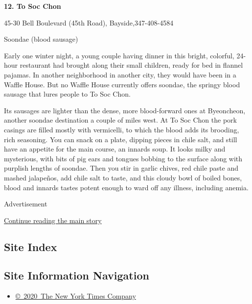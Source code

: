 \textbf{12. To Soc Chon}

45-30 Bell Boulevard (45th Road), Bayside,347-408-4584

Soondae (blood sausage)

Early one winter night, a young couple having dinner in this bright,
colorful, 24-hour restaurant had brought along their small children,
ready for bed in flannel pajamas. In another neighborhood in another
city, they would have been in a Waffle House. But no Waffle House
currently offers soondae, the springy blood sausage that lures people to
To Soc Chon.

Its sausages are lighter than the dense, more blood-forward ones at
Byeoncheon, another soondae destination a couple of miles west. At To
Soc Chon the pork casings are filled mostly with vermicelli, to which
the blood adds its brooding, rich seasoning. You can snack on a plate,
dipping pieces in chile salt, and still have an appetite for the main
course, an innards soup. It looks milky and mysterious, with bits of pig
ears and tongues bobbing to the surface along with purplish lengths of
soondae. Then you stir in garlic chives, red chile paste and mashed
jalapeños, add chile salt to taste, and this cloudy bowl of boiled
bones, blood and innards tastes potent enough to ward off any illness,
including anemia.

Advertisement

\protect\hyperlink{after-bottom}{Continue reading the main story}

\hypertarget{site-index}{%
\subsection{Site Index}\label{site-index}}

\hypertarget{site-information-navigation}{%
\subsection{Site Information
Navigation}\label{site-information-navigation}}

\begin{itemize}
\tightlist
\item
  \href{https://help.nytimes3xbfgragh.onion/hc/en-us/articles/115014792127-Copyright-notice}{©~2020~The
  New York Times Company}
\end{itemize}

